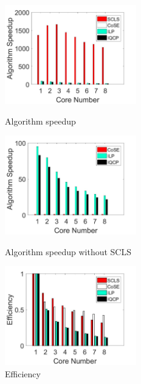 \begin{figure}[htbp]
\centering
\begin{minipage}[t]{0.3\linewidth}
\centering
\includegraphics[width=2.25in]{figures/Multiple}
\caption{Algorithm speedup}
\label{fig:Multiple}
\end{minipage}
\hfill
\begin{minipage}[t]{0.3\linewidth}
\centering
\includegraphics[width=2.25in]{figures/MultipleNoSCLS}
\caption{Algorithm speedup without SCLS}
\label{fig:MultipleNoSCLS}
\end{minipage}
\hfill
\begin{minipage}[t]{0.3\linewidth}
\centering
\includegraphics[width=2.25in]{figures/Efficiency}
 \caption{Efficiency}
 \label{fig:Efficiency}
\end{minipage}
\end{figure}


